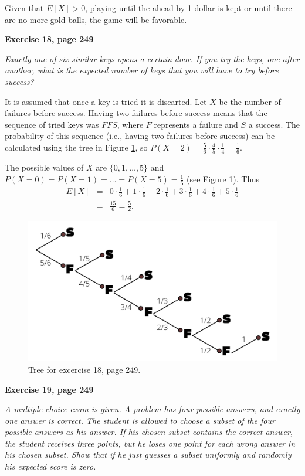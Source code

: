\documentclass[12pt]{article}
\begin{document}
	Given that $E[X] > 0$, playing until the ahead by 1 dollar is kept or until there are no more gold balls, the game will be favorable. 
	
	{\bf Exercise 18, page 249}
	
	{\em Exactly one of six similar keys opens a certain door. If you try the keys, one after another, what is the expected number of keys that you will have to try before success?}
	
	It is assumed that once a key is tried it is discarted. Let $X$ be the number of failures before success. Having two failures before success means that the sequence of tried keys was $FFS$, where $F$ represents a failure and $S$ a success. The probability of this sequence (i.e., having two failures before success) can be calculated using the tree in Figure \ref{keys}, so $P(X=2) = \frac{5}{6} \cdot \frac{4}{5} \cdot \frac{1}{4} = \frac{1}{6}$. 
	
	The possible values of $X$ are $\{0, 1, \ldots, 5\}$ and $P(X = 0) = P(X = 1) = \ldots = P(X = 5) = \frac{1}{6}$ (see Figure \ref{keys}). Thus
	\begin{eqnarray*}
	E[X] &=& 0 \cdot \frac{1}{6} + 1 \cdot \frac{1}{6} + 2 \cdot \frac{1}{6} + 3 \cdot \frac{1}{6} + 4 \cdot \frac{1}{6} + 5 \cdot \frac{1}{6} \\
	&=& \frac{15}{6} = \frac{5}{2}.
	\end{eqnarray*}

	\begin{figure}
	\centering
	\includegraphics[scale=0.2]{exercise_keys.png}	
	\caption{Tree for excercise 18, page 249.}
	\label{keys}
	\end{figure}
	
	{\bf Exercise 19, page 249}
	
	{\em A multiple choice exam is given. A problem has four possible answers, and exactly one answer is correct. The student is allowed to choose a subset of the four possible answers as his answer. If his chosen subset contains the correct answer, the student receives three points, but he loses one point for each wrong answer in his chosen subset. Show that if he just guesses a subset uniformly and randomly his expected score is zero.}
	
\end{document}
